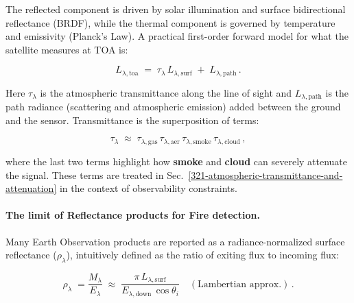 \begin{table}[ht]
{\begin{equation}
\end{equation}

The reflected component is driven by solar illumination and surface bidirectional reflectance (BRDF), while the thermal component is governed by temperature and emissivity (Planck's Law). A practical first-order forward model for what the satellite measures at TOA is:

\begin{equation}

L_{\lambda,\mathrm{toa}} \;=\; \tau_{\lambda}\,L_{\lambda,\mathrm{surf}} \; +\; L_{\lambda,\mathrm{path}}\,.

\end{equation}

Here $\tau_{\lambda}$ is the atmospheric transmittance along the line of sight and $L_{\lambda,\mathrm{path}}$ is the path radiance (scattering and atmospheric emission) added between the ground and the sensor. Transmittance is the superposition of terms:

\begin{equation}

\tau_{\lambda} \;\approx\; \tau_{\lambda,\mathrm{gas}}\,\tau_{\lambda,\mathrm{aer}}\,\tau_{\lambda,\mathrm{smoke}}\,\tau_{\lambda,\mathrm{cloud}}\,,

\label{eq:tranmitance_atm}

\end{equation}

where the last two terms highlight how \textbf{smoke} and \textbf{cloud} can severely attenuate the signal. These terms are treated in Sec.~\ref{321-atmospheric-transmittance-and-attenuation} in the context of observability constraints.

\paragraph{The limit of Reflectance products for Fire detection.}

Many Earth Observation products are reported as a radiance-normalized surface reflectance ($\rho_\lambda$), intuitively defined as the ratio of exiting flux to incoming flux:

\begin{equation}

\rho_{\lambda} \;= \frac{M_\lambda}{E_\lambda} \;\approx\; \frac{\pi\,L_{\lambda,\mathrm{surf}}}{E_{\lambda,\mathrm{down}}\,\cos\theta_i}\quad (\text{Lambertian approx.})\,.

\end{equation}

}
\end{table}
